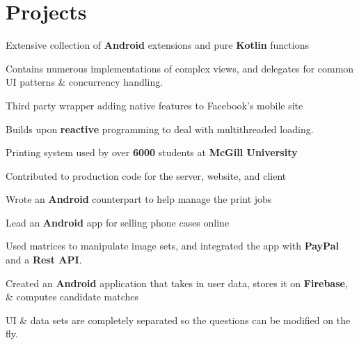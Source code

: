 \documentclass[]{allanwang-resume}
\begin{document}
\begin{minipage}[t]{0.66\textwidth}

	\section{Projects}

	\vspace{\topsep} %
	\begin{tightemize}
		\item Extensive collection of \textbf{Android} extensions and pure \textbf{Kotlin} functions
		\item Contains numerous implementations of complex views, and delegates for common UI patterns \& concurrency handling.
	\end{tightemize}

	\begin{tightemize}
		\item Third party wrapper adding native features to Facebook's mobile site
		\item Builds upon \textbf{reactive} programming to deal with multithreaded loading.
	\end{tightemize}

	\begin{tightemize}
		\item Printing system used by over \textbf{6000} students at \textbf{McGill University}
		\item Contributed to production code for the server, website, and client
		\item Wrote an \textbf{Android} counterpart to help manage the print jobs
	\end{tightemize}

	\begin{tightemize}
		\item Lead an \textbf{Android} app for selling phone cases online
		\item Used matrices to manipulate image sets, and integrated the app with \textbf{PayPal} and a \textbf{Rest API}.
	\end{tightemize}

	\begin{tightemize}
		\item Created an \textbf{Android} application that takes in user data, stores it on \textbf{Firebase}, \& computes candidate matches
		\item UI \& data sets are completely separated so the questions can be modified on the fly.
	\end{tightemize}


\end{minipage}
\end{document}
